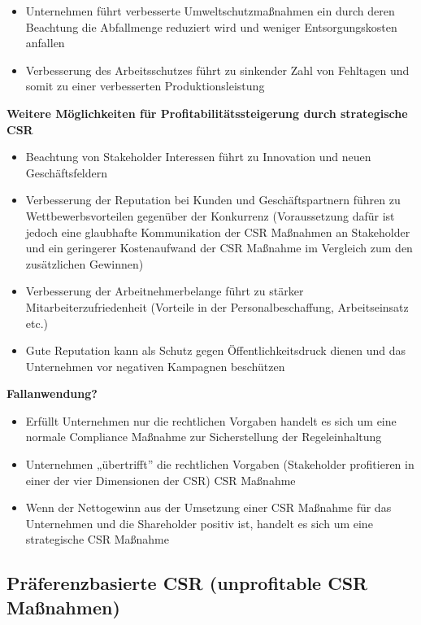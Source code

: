 \documentclass[
]{article}
\providecommand{\tightlist}{%
  \setlength{\itemsep}{0pt}\setlength{\parskip}{0pt}}
\begin{document}
\begin{itemize}
\tightlist
\item
  Unternehmen führt verbesserte Umweltschutzmaßnahmen ein durch deren
  Beachtung die Abfallmenge reduziert wird und weniger Entsorgungskosten
  anfallen
\item
  Verbesserung des Arbeitsschutzes führt zu sinkender Zahl von Fehltagen
  und somit zu einer verbesserten Produktionsleistung
\end{itemize}

\textbf{Weitere Möglichkeiten für Profitabilitätssteigerung durch
strategische CSR}

\begin{itemize}
\tightlist
\item
  Beachtung von Stakeholder Interessen führt zu Innovation und neuen
  Geschäftsfeldern
\item
  Verbesserung der Reputation bei Kunden und Geschäftspartnern führen zu
  Wettbewerbsvorteilen gegenüber der Konkurrenz (Voraussetzung dafür ist
  jedoch eine glaubhafte Kommunikation der CSR Maßnahmen an Stakeholder
  und ein geringerer Kostenaufwand der CSR Maßnahme im Vergleich zum den
  zusätzlichen Gewinnen)
\item
  Verbesserung der Arbeitnehmerbelange führt zu stärker
  Mitarbeiterzufriedenheit (Vorteile in der Personalbeschaffung,
  Arbeitseinsatz etc.)
\item
  Gute Reputation kann als Schutz gegen Öffentlichkeitsdruck dienen und
  das Unternehmen vor negativen Kampagnen beschützen
\end{itemize}

\textbf{Fallanwendung?}

\begin{itemize}
\tightlist
\item
  Erfüllt Unternehmen nur die rechtlichen Vorgaben handelt es sich um
  eine normale Compliance Maßnahme zur Sicherstellung der
  Regeleinhaltung
\item
  Unternehmen „übertrifft'' die rechtlichen Vorgaben (Stakeholder
  profitieren in einer der vier Dimensionen der CSR) CSR Maßnahme
\item
  Wenn der Nettogewinn aus der Umsetzung einer CSR Maßnahme für das
  Unternehmen und die Shareholder positiv ist, handelt es sich um eine
  strategische CSR Maßnahme
\end{itemize}

\hypertarget{pruxe4ferenzbasierte-csr-unprofitable-csr-mauxdfnahmen}{%
\subsection{Präferenzbasierte CSR (unprofitable CSR
Maßnahmen)}\label{pruxe4ferenzbasierte-csr-unprofitable-csr-mauxdfnahmen}}
\end{document}
